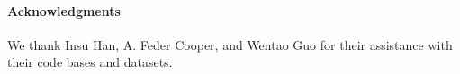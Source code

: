 \paragraph{Acknowledgments}

We thank Insu Han, A. Feder Cooper, and Wentao Guo for their assistance with their code bases and datasets. 